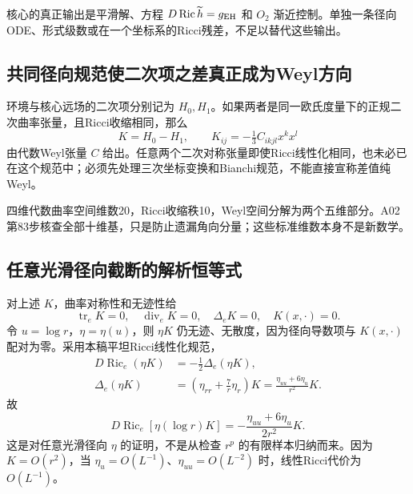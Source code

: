 \documentclass[UTF8,a4paper,11pt,fontset=fandol]{ctexart}
\numberwithin{equation}{section}
\theoremstyle{definition}
\newcommand{\Ric}{\operatorname{Ric}}
\newcommand{\tr}{\operatorname{tr}}
\begin{document}
核心的真正输出是平滑解、方程 $D\Ric\widetilde h=g_{\rm EH}$ 和 $O_2$ 渐近控制。单独一条径向ODE、形式级数或在一个坐标系的Ricci残差，不足以替代这些输出。

\subsection{共同径向规范使二次项之差真正成为Weyl方向}
环境与核心远场的二次项分别记为 $H_0,H_1$。如果两者是同一欧氏度量下的正规二次曲率张量，且Ricci收缩相同，那么
\[
K=H_0-H_1,\qquad
K_{ij}=-\tfrac13 C_{ikjl}x^kx^l
\]
由代数Weyl张量 $C$ 给出。任意两个二次对称张量即使Ricci线性化相同，也未必已在这个规范中；必须先处理三次坐标变换和Bianchi规范，不能直接宣称差值纯Weyl。

四维代数曲率空间维数20，Ricci收缩秩10，Weyl空间分解为两个五维部分。A02第83步核查全部十维基，只是防止遗漏角向分量；这些标准维数本身不是新数学。

\subsection{任意光滑径向截断的解析恒等式}
对上述 $K$，曲率对称性和无迹性给
\[
\tr_eK=0,\quad \operatorname{div}_eK=0,\quad
\Delta_eK=0,\quad K(x,\cdot)=0.
\]
令 $u=\log r$，$\eta=\eta(u)$，则 $\eta K$ 仍无迹、无散度，因为径向导数项与 $K(x,\cdot)$ 配对为零。采用本稿平坦Ricci线性化规范，
\begin{align}
D\Ric_e(\eta K)&=-\tfrac12\Delta_e(\eta K),\\
\Delta_e(\eta K)&=\left(\eta_{rr}+\frac7r\eta_r\right)K
=\frac{\eta_{uu}+6\eta_u}{r^2}K.
\end{align}
故
\begin{equation}\label{eq:logidentity}
\boxed{D\Ric_e[\eta(\log r)K]=-
\frac{\eta_{uu}+6\eta_u}{2r^2}K.}
\end{equation}
这是对任意光滑径向 $\eta$ 的证明，不是从检查 $r^p$ 的有限样本归纳而来。因为 $K=O(r^2)$，当 $\eta_u=O(L^{-1})$、$\eta_{uu}=O(L^{-2})$ 时，线性Ricci代价为 $O(L^{-1})$。
\end{document}
